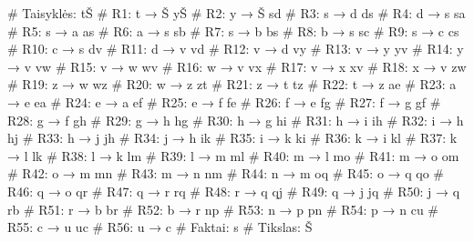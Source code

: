 \begin{pythonaienv}[fc]
# Taisyklės:
tŠ                                      # R1: t → Š
yŠ                                      # R2: y → Š
sd                                      # R3: s → d
ds                                      # R4: d → s
sa                                      # R5: s → a
as                                      # R6: a → s
sb                                      # R7: s → b
bs                                      # R8: b → s
sc                                      # R9: s → c
cs                                      # R10: c → s
dv                                      # R11: d → v
vd                                      # R12: v → d
vy                                      # R13: v → y
yv                                      # R14: y → v
vw                                      # R15: v → w
wv                                      # R16: w → v
vx                                      # R17: v → x
xv                                      # R18: x → v
zw                                      # R19: z → w
wz                                      # R20: w → z
zt                                      # R21: z → t
tz                                      # R22: t → z
ae                                      # R23: a → e
ea                                      # R24: e → a
ef                                      # R25: e → f
fe                                      # R26: f → e
fg                                      # R27: f → g
gf                                      # R28: g → f
gh                                      # R29: g → h
hg                                      # R30: h → g
hi                                      # R31: h → i
ih                                      # R32: i → h
hj                                      # R33: h → j
jh                                      # R34: j → h
ik                                      # R35: i → k
ki                                      # R36: k → i
kl                                      # R37: k → l
lk                                      # R38: l → k
lm                                      # R39: l → m
ml                                      # R40: m → l
mo                                      # R41: m → o
om                                      # R42: o → m
mn                                      # R43: m → n
nm                                      # R44: n → m
oq                                      # R45: o → q
qo                                      # R46: q → o
qr                                      # R47: q → r
rq                                      # R48: r → q
qj                                      # R49: q → j
jq                                      # R50: j → q
rb                                      # R51: r → b
br                                      # R52: b → r
np                                      # R53: n → p
pn                                      # R54: p → n
cu                                      # R55: c → u
uc                                      # R56: u → c
# Faktai:
s
# Tikslas:
Š
\end{pythonaienv}
